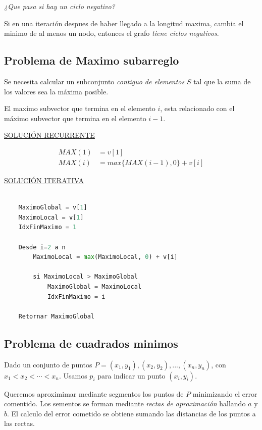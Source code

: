 \documentclass{article}
\begin{document}
\textit{¿Que pasa si hay un ciclo negativo?}

Si en una iteración despues de haber llegado a la longitud maxima, cambia el minimo de al menos un nodo, entonces el grafo \textit{tiene ciclos negativos}.

\newpage
\subsection{Problema de Maximo subarreglo}

Se necesita calcular un subconjunto \textit{contiguo de elementos} \(S\) 
tal que la suma de los valores sea la máxima posible. 

El maximo subvector que termina en el elemento \(i\), esta relacionado con el máximo
subvector que termina en el elemento \(i-1\).

\underline{SOLUCIÓN RECURRENTE}

\begin{align*}
    MAX(1) &= v[1] \\
    MAX(i) &= max\{MAX(i-1), 0\} + v[i]
\end{align*}
    

\underline{SOLUCIÓN ITERATIVA}

\begin{lstlisting}[language=Python, caption=Solución iterativa]

    MaximoGlobal = v[1]
    MaximoLocal = v[1]
    IdxFinMaximo = 1

    Desde i=2 a n
        MaximoLocal = max(MaximoLocal, 0) + v[i]

        si MaximoLocal > MaximoGlobal
            MaximoGlobal = MaximoLocal 
            IdxFinMaximo = i

    Retornar MaximoGlobal

\end{lstlisting}

\newpage
\subsection{Problema de cuadrados minimos}

Dado un conjunto de puntos \(P={(x_1,y_1),(x_2,y_2),...,(x_n,y_n)}\), con \(x_1<x_2<\cdots<x_n\). 
Usamos \(p_i\) para indicar un punto \((x_i, y_i)\). 

Queremos aproximimar mediante segmentos los puntos de \(P\) minimizando el error comentido. 
Los sementos se forman mediante \textit{rectas de aproximación} hallando \(a\) y \(b\). 
El calculo del error cometido se obtiene sumando las distancias de los puntos a las rectas. 
\end{document}
